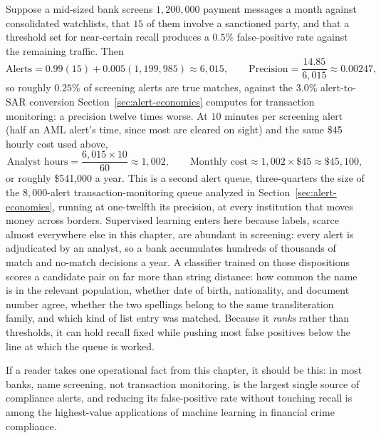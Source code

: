 \documentclass[../ai_in_finance]{subfiles}
\begin{document}
Suppose a mid-sized bank screens $1{,}200{,}000$ payment messages a month against consolidated watchlists, that $15$ of them involve a sanctioned party, and that a threshold set for near-certain recall produces a $0.5\%$ false-positive rate against the remaining traffic. Then
\begin{equation*}
\text{Alerts} = 0.99(15) + 0.005(1{,}199{,}985) \approx 6{,}015, \qquad \text{Precision} = \frac{14.85}{6{,}015} \approx 0.00247,
\end{equation*}
so roughly $0.25\%$ of screening alerts are true matches, against the $3.0\%$ alert-to-SAR conversion Section~\ref{sec:alert-economics} computes for transaction monitoring: a precision twelve times worse. At $10$ minutes per screening alert (half an AML alert's time, since most are cleared on sight) and the same \$45 hourly cost used above,
\begin{equation*}
\text{Analyst hours} = \frac{6{,}015 \times 10}{60} \approx 1{,}002, \qquad \text{Monthly cost} \approx 1{,}002 \times \$45 \approx \$45{,}100,
\end{equation*}
or roughly \$541,000 a year. This is a second alert queue, three-quarters the size of the $8{,}000$-alert transaction-monitoring queue analyzed in Section~\ref{sec:alert-economics}, running at one-twelfth its precision, at every institution that moves money across borders. Supervised learning enters here because labels, scarce almost everywhere else in this chapter, are abundant in screening: every alert is adjudicated by an analyst, so a bank accumulates hundreds of thousands of match and no-match decisions a year. A classifier trained on those dispositions scores a candidate pair on far more than string distance: how common the name is in the relevant population, whether date of birth, nationality, and document number agree, whether the two spellings belong to the same transliteration family, and which kind of list entry was matched. Because it \emph{ranks} rather than thresholds, it can hold recall fixed while pushing most false positives below the line at which the queue is worked.

If a reader takes one operational fact from this chapter, it should be this: in most banks, name screening, not transaction monitoring, is the largest single source of compliance alerts, and reducing its false-positive rate without touching recall is among the highest-value applications of machine learning in financial crime compliance.
\end{document}
